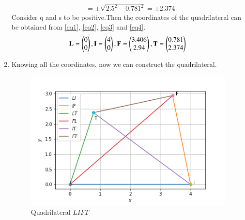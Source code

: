 \documentclass[journal,12pt,twocolumn]{IEEEtran}
\begin{document}
\begin{enumerate}
\begin{align}
   &=\pm\sqrt{2.5^2-0.781^2}=\pm2.374
\end{align}
Consider q and s to be positive.Then the coordinates of the quadrilateral can be obtained from \ref{eq1}, \ref{eq2}, \ref{eq3} and \ref{eq4}.
\begin{equation}
\mathbf{L}=\begin{pmatrix}0\\0\end{pmatrix},\mathbf{I}=\begin{pmatrix}4\\0\end{pmatrix},\mathbf{F}=\begin{pmatrix}3.406\\2.94\end{pmatrix},\mathbf{T}=\begin{pmatrix}0.781\\2.374\end{pmatrix}
\end{equation}
\item Knowing all the coordinates, now we can construct the quadrilateral.
\begin{figure}[!ht]
\centering
    \includegraphics[width= \columnwidth]{quad1.png}
    \caption{Quadrilateral $LIFT$}
\end{figure}
\end{enumerate}
\end{document}
